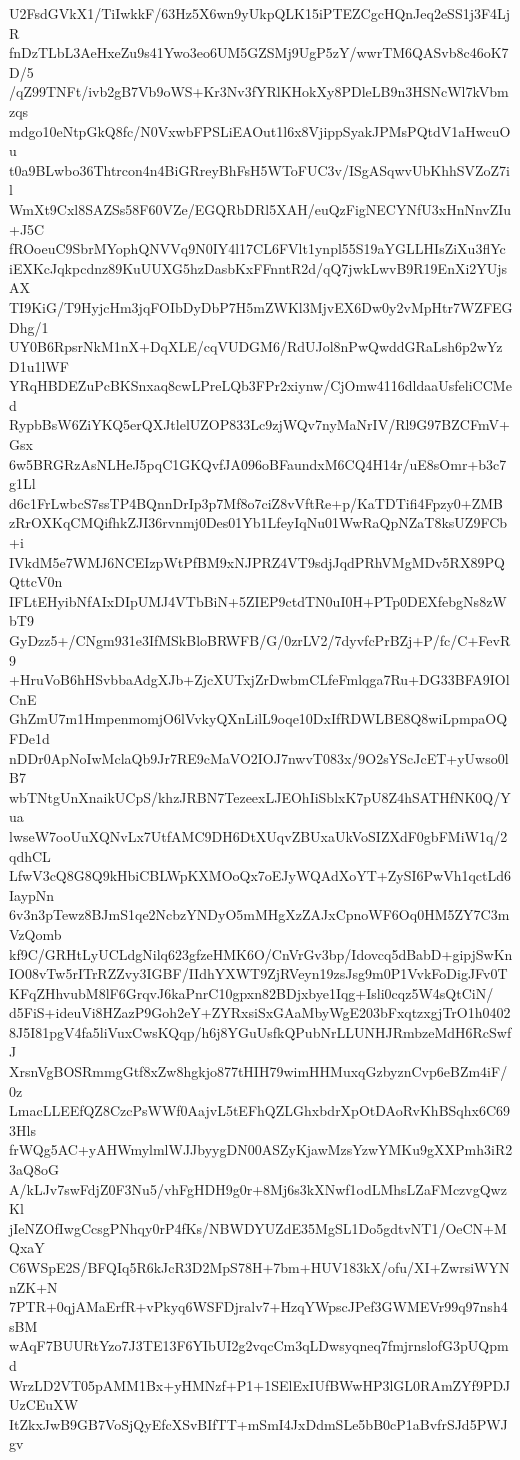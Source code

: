U2FsdGVkX1/TiIwkkF/63Hz5X6wn9yUkpQLK15iPTEZCgcHQnJeq2eSS1j3F4LjR
fnDzTLbL3AeHxeZu9s41Ywo3eo6UM5GZSMj9UgP5zY/wwrTM6QASvb8c46oK7D/5
/qZ99TNFt/ivb2gB7Vb9oWS+Kr3Nv3fYRlKHokXy8PDleLB9n3HSNcWl7kVbmzqs
mdgo10eNtpGkQ8fc/N0VxwbFPSLiEAOut1l6x8VjippSyakJPMsPQtdV1aHwcuOu
t0a9BLwbo36Thtrcon4n4BiGRreyBhFsH5WToFUC3v/ISgASqwvUbKhhSVZoZ7il
WmXt9Cxl8SAZSs58F60VZe/EGQRbDRl5XAH/euQzFigNECYNfU3xHnNnvZIu+J5C
fROoeuC9SbrMYophQNVVq9N0IY4l17CL6FVlt1ynpl55S19aYGLLHIsZiXu3flYc
iEXKcJqkpcdnz89KuUUXG5hzDasbKxFFnntR2d/qQ7jwkLwvB9R19EnXi2YUjsAX
TI9KiG/T9HyjcHm3jqFOIbDyDbP7H5mZWKl3MjvEX6Dw0y2vMpHtr7WZFEGDhg/1
UY0B6RpsrNkM1nX+DqXLE/cqVUDGM6/RdUJol8nPwQwddGRaLsh6p2wYzD1u1lWF
YRqHBDEZuPcBKSnxaq8cwLPreLQb3FPr2xiynw/CjOmw4116dldaaUsfeliCCMed
RypbBsW6ZiYKQ5erQXJtlelUZOP833Lc9zjWQv7nyMaNrIV/Rl9G97BZCFmV+Gsx
6w5BRGRzAsNLHeJ5pqC1GKQvfJA096oBFaundxM6CQ4H14r/uE8sOmr+b3c7g1Ll
d6c1FrLwbcS7ssTP4BQnnDrIp3p7Mf8o7ciZ8vVftRe+p/KaTDTifi4Fpzy0+ZMB
zRrOXKqCMQifhkZJI36rvnmj0Des01Yb1LfeyIqNu01WwRaQpNZaT8ksUZ9FCb+i
IVkdM5e7WMJ6NCEIzpWtPfBM9xNJPRZ4VT9sdjJqdPRhVMgMDv5RX89PQQttcV0n
IFLtEHyibNfAIxDIpUMJ4VTbBiN+5ZIEP9ctdTN0uI0H+PTp0DEXfebgNs8zWbT9
GyDzz5+/CNgm931e3IfMSkBloBRWFB/G/0zrLV2/7dyvfcPrBZj+P/fc/C+FevR9
+HruVoB6hHSvbbaAdgXJb+ZjcXUTxjZrDwbmCLfeFmlqga7Ru+DG33BFA9IOlCnE
GhZmU7m1HmpenmomjO6lVvkyQXnLilL9oqe10DxIfRDWLBE8Q8wiLpmpaOQFDe1d
nDDr0ApNoIwMclaQb9Jr7RE9cMaVO2IOJ7nwvT083x/9O2sYScJcET+yUwso0lB7
wbTNtgUnXnaikUCpS/khzJRBN7TezeexLJEOhIiSblxK7pU8Z4hSATHfNK0Q/Yua
lwseW7ooUuXQNvLx7UtfAMC9DH6DtXUqvZBUxaUkVoSIZXdF0gbFMiW1q/2qdhCL
LfwV3cQ8G8Q9kHbiCBLWpKXMOoQx7oEJyWQAdXoYT+ZySI6PwVh1qctLd6IaypNn
6v3n3pTewz8BJmS1qe2NcbzYNDyO5mMHgXzZAJxCpnoWF6Oq0HM5ZY7C3mVzQomb
kf9C/GRHtLyUCLdgNilq623gfzeHMK6O/CnVrGv3bp/Idovcq5dBabD+gipjSwKn
IO08vTw5rITrRZZvy3IGBF/IIdhYXWT9ZjRVeyn19zsJsg9m0P1VvkFoDigJFv0T
KFqZHhvubM8lF6GrqvJ6kaPnrC10gpxn82BDjxbye1Iqg+Isli0cqz5W4sQtCiN/
d5FiS+ideuVi8HZazP9Goh2eY+ZYRxsiSxGAaMbyWgE203bFxqtzxgjTrO1h0402
8J5I81pgV4fa5liVuxCwsKQqp/h6j8YGuUsfkQPubNrLLUNHJRmbzeMdH6RcSwfJ
XrsnVgBOSRmmgGtf8xZw8hgkjo877tHIH79wimHHMuxqGzbyznCvp6eBZm4iF/0z
LmacLLEEfQZ8CzcPsWWf0AajvL5tEFhQZLGhxbdrXpOtDAoRvKhBSqhx6C693Hls
frWQg5AC+yAHWmylmlWJJbyygDN00ASZyKjawMzsYzwYMKu9gXXPmh3iR23aQ8oG
A/kLJv7swFdjZ0F3Nu5/vhFgHDH9g0r+8Mj6s3kXNwf1odLMhsLZaFMczvgQwzKl
jIeNZOfIwgCcsgPNhqy0rP4fKs/NBWDYUZdE35MgSL1Do5gdtvNT1/OeCN+MQxaY
C6WSpE2S/BFQIq5R6kJcR3D2MpS78H+7bm+HUV183kX/ofu/XI+ZwrsiWYNnZK+N
7PTR+0qjAMaErfR+vPkyq6WSFDjralv7+HzqYWpscJPef3GWMEVr99q97nsh4sBM
wAqF7BUURtYzo7J3TE13F6YIbUI2g2vqcCm3qLDwsyqneq7fmjrnslofG3pUQpmd
WrzLD2VT05pAMM1Bx+yHMNzf+P1+1SElExIUfBWwHP3lGL0RAmZYf9PDJUzCEuXW
ItZkxJwB9GB7VoSjQyEfcXSvBIfTT+mSmI4JxDdmSLe5bB0cP1aBvfrSJd5PWJgv
